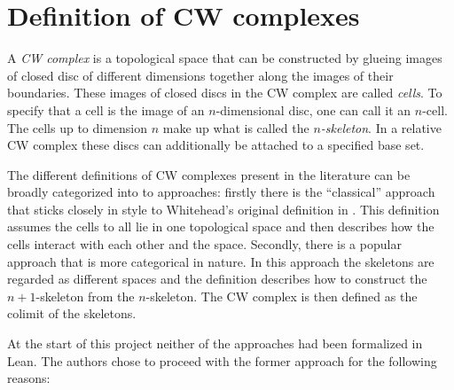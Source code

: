 \section{Definition of CW complexes}


A \emph{CW complex} is a topological space that can be constructed by glueing images of closed disc of different dimensions together along the images of their boundaries. 
These images of closed discs in the CW complex are called \emph{cells}.
To specify that a cell is the image of an $n$-dimensional disc, one can call it an $n$-cell.
The cells up to dimension $n$ make up what is called the \emph{$n$-skeleton}.
In a relative CW complex these discs can additionally be attached to a specified base set. 

The different definitions of CW complexes present in the literature can be broadly categorized into to approaches: firstly there is the ``classical'' approach that sticks closely in style to Whitehead's original definition in \cite{Whitehead2018}.
This definition assumes the cells to all lie in one topological space and then describes how the cells interact with each other and the space.
Secondly, there is a popular approach that is more categorical in nature. 
In this approach the skeletons are regarded as different spaces and the definition describes how to construct the $n+1$-skeleton from the $n$-skeleton. 
The CW complex is then defined as the colimit of the skeletons. 

At the start of this project neither of the approaches had been formalized in Lean. 
The authors chose to proceed with the former approach for the following reasons: 